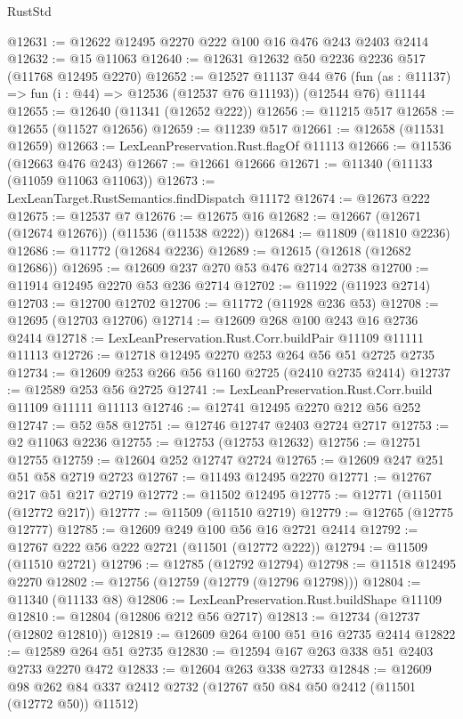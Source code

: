 \begin{lexlean}{RustStd}
\begin{coremodule}
@12631 := @12622 @12495 @2270 @222 @100 @16 @476 @243 @2403 @2414
@12632 := @15 @11063
@12640 := @12631 @12632 @50 @2236 @2236 @517 (@11768 @12495 @2270)
@12652 := @12527
    @11137
    @44
    @76
    (fun (as : @11137) => fun (i : @44) => @12536 (@12537 @76 @11193))
    (@12544 @76)
    @11144
@12655 := @12640 (@11341 (@12652 @222))
@12656 := @11215 @517
@12658 := @12655 (@11527 @12656)
@12659 := @11239 @517
@12661 := @12658 (@11531 @12659)
@12663 := LexLeanPreservation.Rust.flagOf @11113
@12666 := @11536 (@12663 @476 @243)
@12667 := @12661 @12666
@12671 := @11340 (@11133 (@11059 @11063 @11063))
@12673 := LexLeanTarget.RustSemantics.findDispatch @11172
@12674 := @12673 @222
@12675 := @12537 @7
@12676 := @12675 @16
@12682 := @12667 (@12671 (@12674 @12676)) (@11536 (@11538 @222))
@12684 := @11809 (@11810 @2236)
@12686 := @11772 (@12684 @2236)
@12689 := @12615 (@12618 (@12682 @12686))
@12695 := @12609 @237 @270 @53 @476 @2714 @2738
@12700 := @11914 @12495 @2270 @53 @236 @2714
@12702 := @11922 (@11923 @2714)
@12703 := @12700 @12702
@12706 := @11772 (@11928 @236 @53)
@12708 := @12695 (@12703 @12706)
@12714 := @12609 @268 @100 @243 @16 @2736 @2414
@12718 := LexLeanPreservation.Rust.Corr.buildPair @11109 @11111 @11113
@12726 := @12718 @12495 @2270 @253 @264 @56 @51 @2725 @2735
@12734 := @12609 @253 @266 @56 @1160 @2725 (@2410 @2735 @2414)
@12737 := @12589 @253 @56 @2725
@12741 := LexLeanPreservation.Rust.Corr.build @11109 @11111 @11113
@12746 := @12741 @12495 @2270 @212 @56 @252
@12747 := @52 @58
@12751 := @12746 @12747 @2403 @2724 @2717
@12753 := @2 @11063 @2236
@12755 := @12753 (@12753 @12632)
@12756 := @12751 @12755
@12759 := @12604 @252 @12747 @2724
@12765 := @12609 @247 @251 @51 @58 @2719 @2723
@12767 := @11493 @12495 @2270
@12771 := @12767 @217 @51 @217 @2719
@12772 := @11502 @12495
@12775 := @12771 (@11501 (@12772 @217))
@12777 := @11509 (@11510 @2719)
@12779 := @12765 (@12775 @12777)
@12785 := @12609 @249 @100 @56 @16 @2721 @2414
@12792 := @12767 @222 @56 @222 @2721 (@11501 (@12772 @222))
@12794 := @11509 (@11510 @2721)
@12796 := @12785 (@12792 @12794)
@12798 := @11518 @12495 @2270
@12802 := @12756 (@12759 (@12779 (@12796 @12798)))
@12804 := @11340 (@11133 @8)
@12806 := LexLeanPreservation.Rust.buildShape @11109
@12810 := @12804 (@12806 @212 @56 @2717)
@12813 := @12734 (@12737 (@12802 @12810))
@12819 := @12609 @264 @100 @51 @16 @2735 @2414
@12822 := @12589 @264 @51 @2735
@12830 := @12594 @167 @263 @338 @51 @2403 @2733 @2270 @472
@12833 := @12604 @263 @338 @2733
@12848 := @12609
    @98
    @262
    @84
    @337
    @2412
    @2732
    (@12767 @50 @84 @50 @2412 (@11501 (@12772 @50)) @11512)

\end{coremodule}
\end{lexlean}
